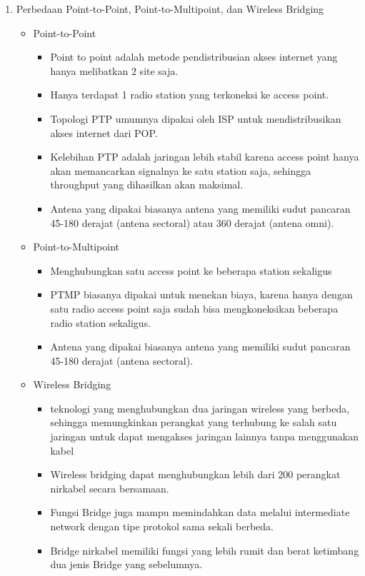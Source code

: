 \begin{enumerate}
	\item Perbedaan Point-to-Point, Point-to-Multipoint, dan Wireless Bridging
	\begin{itemize}
		\item Point-to-Point
		\begin{itemize}
			\item Point to point adalah metode pendistribusian akses internet yang hanya melibatkan 2 site saja.
			\item Hanya terdapat 1 radio station yang terkoneksi ke access point.
			\item Topologi PTP umumnya dipakai oleh ISP untuk mendistribusikan akses internet dari POP. 
			\item Kelebihan PTP adalah jaringan lebih stabil karena access point hanya akan memancarkan signalnya ke satu station saja, sehingga throughput yang dihasilkan akan maksimal. 
			\item Antena yang dipakai biasanya antena yang memiliki sudut pancaran 45-180 derajat (antena sectoral) atau 360 derajat (antena omni).
		\end{itemize}

		\item Point-to-Multipoint
		\begin{itemize}
			\item Menghubungkan satu access point ke beberapa station sekaligus
			\item PTMP biasanya dipakai untuk menekan biaya, karena hanya dengan satu radio access point saja sudah bisa mengkoneksikan beberapa radio station sekaligus. 
			\item Antena yang dipakai biasanya antena yang memiliki sudut pancaran 45-180 derajat (antena sectoral).
		\end{itemize}

		\item Wireless Bridging
		\begin{itemize}
			\item teknologi yang menghubungkan dua jaringan wireless yang berbeda, sehingga memungkinkan perangkat yang terhubung ke salah satu jaringan untuk dapat mengakses jaringan lainnya tanpa menggunakan kabel
			\item Wireless bridging dapat menghubungkan lebih dari 200 perangkat nirkabel secara bersamaan. 
			\item Fungsi Bridge juga mampu memindahkan data melalui intermediate network dengan tipe protokol sama sekali berbeda. 
			\item Bridge nirkabel memiliki fungsi yang lebih rumit dan berat ketimbang dua jenis Bridge yang sebelumnya.
		\end{itemize}
		

\end{itemize}
\end{enumerate}
